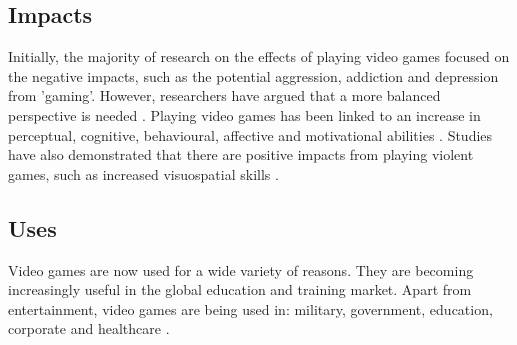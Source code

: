 \documentclass[a4paper,11.5pt]{report}
\numberwithin{figure}{section}
\numberwithin{table}{section}
\numberwithin{equation}{section}
\numberwithin{equation}{section}
\begin{document}


\subsection{Impacts}


Initially, the majority of research on the effects of playing video games focused on the negative impacts, such as the potential aggression, addiction and depression from 'gaming'. However, researchers have argued that a more balanced perspective is needed \citep{Granic2014}. Playing video games has been linked to an increase in perceptual, cognitive, behavioural, affective and motivational abilities \citep{Connolly2012}. Studies have also demonstrated that there are positive impacts from playing violent games, such as increased visuospatial skills \citep{Ferguson2007}. 

\subsection{Uses}

Video games are now used for a wide variety of reasons. They are becoming increasingly useful in the global education and training market. Apart from entertainment, video games are being used in: military, government, education, corporate and healthcare \citep{Johann2015}.

\end{document}
